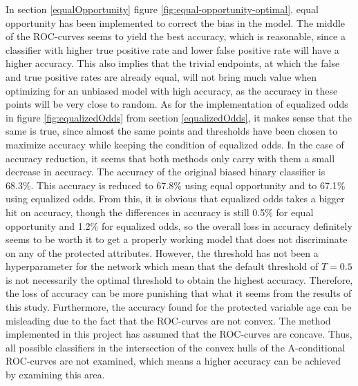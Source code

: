 \documentclass[11pt, fleqn, titlepage]{article}
\begin{document}
	In section \ref{equalOpportunity} figure \ref{fig:equal-opportunity-optimal}, equal opportunity has been implemented to correct the bias in the model. The middle of the ROC-curves seems to yield the best accuracy, which is reasonable, since a classifier with higher true positive rate and lower false positive rate will have a higher accuracy. This also implies that the trivial endpoints, at which the false and true positive rates are already equal, will not bring much value when optimizing for an unbiased model with high accuracy, as the accuracy in these points will be very close to random. As for the implementation of equalized odds in figure \ref{fig:equalizedOdds} from section \ref{equalizedOdds}, it makes sense that the same is true, since almost the same points and thresholds have been chosen to maximize accuracy while keeping the condition of equalized odds. In the case of accuracy reduction, it seems that both methods only carry with them a small decrease in accuracy. The accuracy of the original biased binary classifier is 68.3\%. This accuracy is reduced to 67.8\% using equal opportunity and to 67.1\% using equalized odds. From this, it is obvious that equalized odds takes a bigger hit on accuracy, though the differences in accuracy is still 0.5\% for equal opportunity and 1.2\% for equalized odds, so the overall loss in accuracy definitely seems to be worth it to get a properly working model that does not discriminate on any of the protected attributes. However, the threshold has not been a hyperparameter for the network which mean that the default threshold of $ T = 0.5 $ is not necessarily the optimal threshold to obtain the highest accuracy. Therefore, the loss of accuracy can be more punishing that what it seems from the results of this study. Furthermore, the accuracy found for the protected variable age can be misleading due to the fact that the ROC-curves are not convex. The method implemented in this project has assumed that the ROC-curves are concave. Thus, all possible classifiers in the intersection of the convex hulls of the A-conditional ROC-curves are not examined, which means a higher accuracy can be achieved by examining this area.
	
\end{document}
